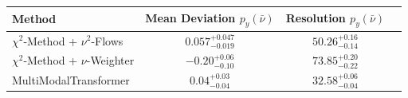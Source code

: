     \begin{tabular}{lccc}
        \toprule
        Method & Mean Deviation $p_{y}(\bar{\nu})$ & Resolution $p_{y}(\bar{\nu})$ \\
        \midrule
        $\chi^2$-Method + $\nu^2$-Flows & $0.057^{+0.047}_{-0.019}$ & $50.26^{+0.16}_{-0.14}$ \\
        $\chi^2$-Method + $\nu$-Weighter & $-0.20^{+0.06}_{-0.10}$ & $73.85^{+0.20}_{-0.22}$ \\
        MultiModalTransformer & $0.04^{+0.03}_{-0.04}$ & $32.58^{+0.06}_{-0.04}$ \\
        \bottomrule
    \end{tabular}
